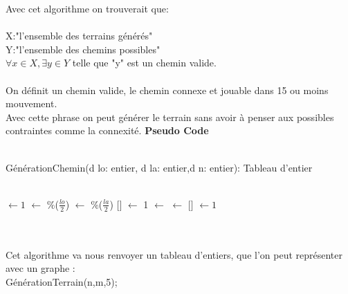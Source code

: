 \documentclass{article}
\begin{document}
Avec cet algorithme on trouverait que:\\~\\
X:"l'ensemble des terrains générés" \\
Y:"l'ensemble des chemins possibles"\\
\(\forall x \in X, \exists y \in Y\) telle que "y" est un chemin valide.\\~\\
On définit un chemin valide, le chemin connexe et jouable dans 15 ou moins mouvement.\\
Avec cette phrase on peut générer le terrain sans avoir à penser aux possibles contraintes comme la connexité.
\newpage
\textbf{\Large{Pseudo Code}}\\~\\
\begin{algorithm}[H]
	\caption{GénérationChemin(d lo: entier, d la: entier,d n: entier): Tableau d'entier}
	\Debut\\
	\BlankLine
	\I $\leftarrow 1$\;
	\Va $\leftarrow$ \Random{}$\%$($\frac{lo}{2}$)\;
	\Vb $\leftarrow$ \Random{}$\%$($\frac{la}{2}$)\;
	\TAB{\Va}$[$\Vb$]$ $\leftarrow$ 1\;
	\While{\I $<$ \N}
	{
		\DIR $\leftarrow$ \GDIR{}\;
		\V $\leftarrow$ \NPOS{\V ,\DIR}\;
		{
			\TAB{\Va}$[$\Vb$]$ $\leftarrow 1$\;
		}
	}
	\Return \TAB\;
\end{algorithm}
~\\~\\
\newpage
Cet algorithme va nous renvoyer un tableau d'entiers, que l'on peut représenter avec un graphe :\\
GénérationTerrain(n,m,5);\\
\end{document}
